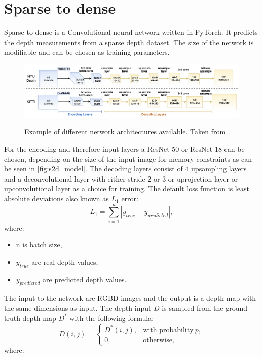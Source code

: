 \documentclass[twoside]{ctuthesis}
\theoremstyle{plain}
\theoremstyle{definition}
\theoremstyle{note}
\begin{document}
\section{Sparse to dense} \label{s2d}
Sparse to dense is a Convolutional neural network written in PyTorch. \cite{ma2018sparsetodense} It predicts the depth measurements from a sparse depth dataset. The size of the network is modifiable and can be chosen as training parameters.
\begin{figure}
	\caption{Example of different network architectures available. Taken from \cite{ma2018sparsetodense}.}
	\includegraphics[width=\textwidth]{sparse2dense.png}
	\centering
	\label{fig:s2d_model}
\end{figure}
For the encoding and therefore input layers a ResNet-50 or ResNet-18 can be chosen, depending on the size of the input image for memory constraints as can be seen in \autoref{fig:s2d_model}. The decoding layers consist of 4 upsampling layers and a deconvolutional layer with either stride 2 or 3 or uprojection layer or upconvolutional layer as a choice for training. The default loss function is least absolute deviations also known as $L_1$ error:
\begin{equation}
	L_1=\sum_{i=1}^{n}|y_{true}-y_{predicted}|,
\end{equation}
where:
\begin{itemize}
	\item n is batch size,
	\item $y_{true}$ are real depth values,
	\item $y_{predicted}$ are predicted depth values.
\end{itemize}
The input to the network are RGBD images and the output is a depth map with the same dimensions as input. The depth input $D$ is sampled from the ground truth depth map $D^*$ with the following formula:
\begin{equation}
	D(i,j)=\begin{cases}
		D^*(i,j),&\text{with probability}\ p,\\
		0,&\text{otherwise},
	\end{cases}
\end{equation}
where:
\end{document}

